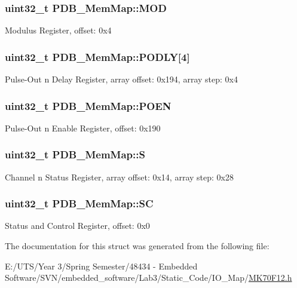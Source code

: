 \subsubsection[{M\+O\+D}]{\setlength{\rightskip}{0pt plus 5cm}uint32\+\_\+t P\+D\+B\+\_\+\+Mem\+Map\+::\+M\+O\+D}\label{struct_p_d_b___mem_map_a01bd648b1caa9b6626636fce386b496d}
Modulus Register, offset\+: 0x4 \hypertarget{struct_p_d_b___mem_map_a69081c41b606ea7a699a67e266a785d5}{}
\subsubsection[{P\+O\+D\+L\+Y}]{\setlength{\rightskip}{0pt plus 5cm}uint32\+\_\+t P\+D\+B\+\_\+\+Mem\+Map\+::\+P\+O\+D\+L\+Y\mbox{[}4\mbox{]}}\label{struct_p_d_b___mem_map_a69081c41b606ea7a699a67e266a785d5}
Pulse-\/\+Out n Delay Register, array offset\+: 0x194, array step\+: 0x4 \hypertarget{struct_p_d_b___mem_map_a259dc7b16cc8f12022cb6a5befb1660c}{}
\subsubsection[{P\+O\+E\+N}]{\setlength{\rightskip}{0pt plus 5cm}uint32\+\_\+t P\+D\+B\+\_\+\+Mem\+Map\+::\+P\+O\+E\+N}\label{struct_p_d_b___mem_map_a259dc7b16cc8f12022cb6a5befb1660c}
Pulse-\/\+Out n Enable Register, offset\+: 0x190 \hypertarget{struct_p_d_b___mem_map_afbd33089148cbb97dedff82c1c91c46d}{}
\subsubsection[{S}]{\setlength{\rightskip}{0pt plus 5cm}uint32\+\_\+t P\+D\+B\+\_\+\+Mem\+Map\+::\+S}\label{struct_p_d_b___mem_map_afbd33089148cbb97dedff82c1c91c46d}
Channel n Status Register, array offset\+: 0x14, array step\+: 0x28 \hypertarget{struct_p_d_b___mem_map_a10fb0324a394cc747b6f7d8b4c811b57}{}
\subsubsection[{S\+C}]{\setlength{\rightskip}{0pt plus 5cm}uint32\+\_\+t P\+D\+B\+\_\+\+Mem\+Map\+::\+S\+C}\label{struct_p_d_b___mem_map_a10fb0324a394cc747b6f7d8b4c811b57}
Status and Control Register, offset\+: 0x0 

The documentation for this struct was generated from the following file\+:\begin{DoxyCompactItemize}
\item 
E\+:/\+U\+T\+S/\+Year 3/\+Spring Semester/48434 -\/ Embedded Software/\+S\+V\+N/embedded\+\_\+software/\+Lab3/\+Static\+\_\+\+Code/\+I\+O\+\_\+\+Map/\hyperlink{_m_k70_f12_8h}{M\+K70\+F12.\+h}\end{DoxyCompactItemize}
